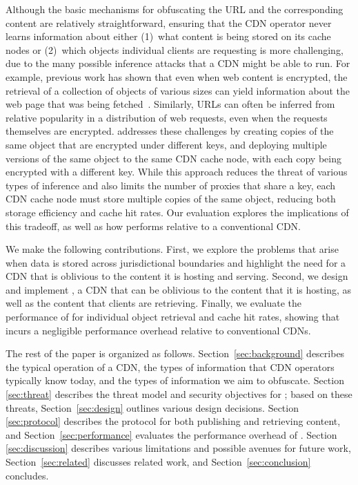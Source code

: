 Although the basic mechanisms for obfuscating the URL and the corresponding
content are relatively straightforward, ensuring that the CDN operator never
learns information about either (1)~what content is being stored on its cache
nodes or (2)~which objects individual clients are requesting is more
challenging, due to the many possible inference attacks that a CDN might be
able to run. For example, previous work has shown that even when web content
is encrypted, the retrieval of a collection of objects of various sizes can
yield information about the web page that was being fetched~\cite{panchenko2016website,
cai2012touching}. Similarly, URLs
can often be inferred from relative popularity in a distribution of web
requests, even when the requests themselves are encrypted. \system{} addresses
these challenges by creating copies of the same object that are encrypted
under different keys, and deploying multiple versions of the same object to
the same CDN cache node, with each copy being encrypted with a different key.
While this approach reduces the threat of various types of inference and also
limits the number of \system{} proxies that share a key, each CDN cache node must
store multiple copies of the same object, reducing both storage efficiency and
cache hit rates. Our evaluation explores the implications of this tradeoff, as
well as how \system{} performs relative to a conventional CDN.

We make the following contributions. First, we explore the problems that
arise when data is stored across jurisdictional boundaries and highlight the
need for a CDN that is oblivious to the content it is hosting and serving.
Second, we design and implement \system{}, a CDN that can be oblivious to the
content that it is hosting, as well as the content that clients are
retrieving. Finally, we evaluate the performance of \system{} for individual
object retrieval and cache hit rates, showing that \system{} incurs a negligible performance
overhead relative to conventional CDNs.

The rest of the paper is organized as follows. Section~\ref{sec:background} describes
the typical operation of a CDN, the types of information that CDN operators
typically know today, and the types of information we aim to obfuscate.  Section~
\ref{sec:threat} describes the threat model and security objectives for \system{}; based
on these threats, Section~\ref{sec:design} outlines various design decisions. Section~
\ref{sec:protocol} describes the protocol for both publishing and retrieving content,
and Section~\ref{sec:performance} evaluates the performance overhead of \system{}. Section~
\ref{sec:discussion} describes various limitations and possible avenues for future
work, Section~\ref{sec:related} discusses related work, and Section~\ref{sec:conclusion}
concludes.


